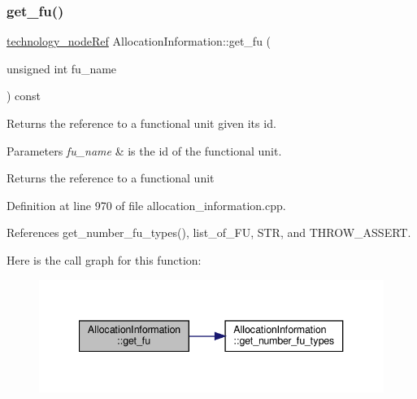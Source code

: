 \subsubsection{\texorpdfstring{get\+\_\+fu()}{get\_fu()}\hspace{0.1cm}{\footnotesize\ttfamily [2/2]}}
{\footnotesize\ttfamily \hyperlink{technology__node_8hpp_a33dd193b7bd6b987bf0d8a770a819fa7}{technology\+\_\+node\+Ref} Allocation\+Information\+::get\+\_\+fu (\begin{DoxyParamCaption}\item[{unsigned int}]{fu\+\_\+name }\end{DoxyParamCaption}) const}



Returns the reference to a functional unit given its id. 


\begin{DoxyParams}{Parameters}
{\em fu\+\_\+name} & is the id of the functional unit. \\
\hline
\end{DoxyParams}
\begin{DoxyReturn}{Returns}
the reference to a functional unit 
\end{DoxyReturn}


Definition at line 970 of file allocation\+\_\+information.\+cpp.



References get\+\_\+number\+\_\+fu\+\_\+types(), list\+\_\+of\+\_\+\+FU, S\+TR, and T\+H\+R\+O\+W\+\_\+\+A\+S\+S\+E\+RT.

Here is the call graph for this function\+:
\nopagebreak
\begin{figure}[H]
\begin{center}
\leavevmode
\includegraphics[width=340pt]{d7/d79/classAllocationInformation_a3eac54b073542febf94679ba50dc5f72_cgraph}
\end{center}
\end{figure}
\mbox{\label{classAllocationInformation_a0dcc17e5484d9fad547e371fb2fd26ef}} 
